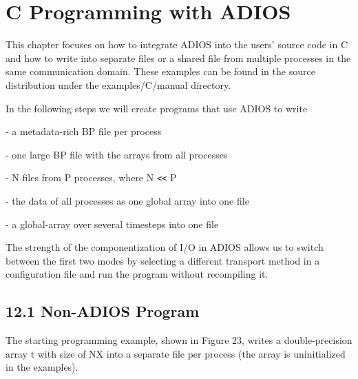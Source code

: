\vspace{10pt}
\section{C Programming with ADIOS}

\vspace{24pt}
This chapter focuses on how to integrate ADIOS into the users' source code in C 
and how to write into separate files or a shared file from multiple processes in 
the same communication domain. These examples can be found in the source distribution 
under the examples/C/manual directory.

\vspace{24pt}
In the following steps we will create programs that use ADIOS to write

\vspace{24pt}
- a metadata-rich BP file per process

\vspace{24pt}
- one large BP file with the arrays from all processes

\vspace{24pt}
- N files from P processes, where N \texttt{<}\texttt{<} P

\vspace{24pt}
- the data of all processes as one global array into one file

\vspace{24pt}
- a global-array over several timesteps into one file

\vspace{24pt}
The strength of the componentization of I/O in ADIOS allows us to switch between 
the first two modes by selecting a different transport method in a configuration 
file and run the program without recompiling it. \label{HToc84890291}\label{HToc212016667}\label{HToc212016909}\label{HToc182553440}

\vspace{24pt}
\subsection*{12.1 \textbf{Non-ADIOS Program}}

\vspace{10pt}
The starting programming example, shown in Figure 23, writes a double-precision 
array t with size of NX into a separate file per process (the array is uninitialized 
in the examples). 

